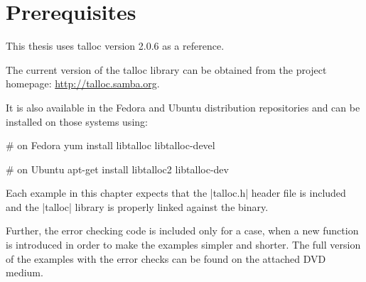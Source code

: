 \section{Prerequisites}
\label{talloc:prerequisites}

This thesis uses talloc version 2.0.6 as a reference.

The current version of the talloc library can be obtained from the project
homepage:
{\footnotesize\url{http://talloc.samba.org}}.

It is also available in the Fedora and Ubuntu distribution repositories and
can be installed on those systems using:

\begin{commandline}
# on Fedora
yum install libtalloc libtalloc-devel

# on Ubuntu
apt-get install libtalloc2 libtalloc-dev
\end{commandline}
\funclistend
Each example in this chapter expects that the |talloc.h| header file is included
and the |talloc| library is properly linked against the binary.

Further, the error checking code is included only for a case, when a new
function is introduced in order to make the examples simpler and shorter. The
full version of the examples with the error checks can be found on the attached
DVD medium.


